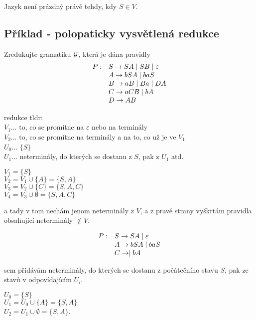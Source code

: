 Jazyk není prázdný právě tehdy, kdy $S \in V$. 

\subsection{Příklad - polopaticky vysvětlená redukce}

Zredukujte gramatiku $\mathcal{G}$, která je dána pravidly 
\[
    \begin{array}{l l}
        P: & S \rightarrow SA \mid SB \mid \varepsilon \\
           & A \rightarrow bSA \mid baS \\
           & B \rightarrow aB \mid Ba \mid DA\\
           & C \rightarrow aCB \mid bA \\
           & D \rightarrow AB \\
    \end{array}
\]

redukce tldr:\\
$V_1\dots$ to, co se promítne na $\varepsilon$ nebo na terminály \\ 
$V_2\dots$ to, co se promítne na terminály a na to, co už je ve $V_1$ \\ 
$U_0\dots$ $\{S\}$ \\
$U_1\dots$ neterminály, do kterých se dostanu z $S$, pak z $U_1$ atd. 

$V_1 = \{S\}$\\ 
$V_2 = V_1 \cup \{A\} = \{S, A\}$\\ 
$V_3 = V_2 \cup \{C\} = \{S, A, C\}$\\ 
$V_4 = V_3 \cup \emptyset = \{S, A, C\}$ 

a tady v tom nechám jenom neterminály z $V$, a z pravé strany vyškrtám pravidla obsahující neterminály $\notin V$. 

\[
    \begin{array}{l l}
        P: & S \rightarrow SA \mid \varepsilon \\
           & A \rightarrow bSA \mid baS \\
           & C \rightarrow \mid bA \\
    \end{array}
\]

sem přidávám neterminály, do kterých se dostanu z počátečního stavu $S$, pak ze stavů v odpovídajícím $U_i$. 

$U_0 = \{S\}$\\ 
$U_1 = U_0 \cup \{A\} = \{S, A\}$ \\
$U_2 = U_1 \cup \emptyset = \{S, A\}$. 

